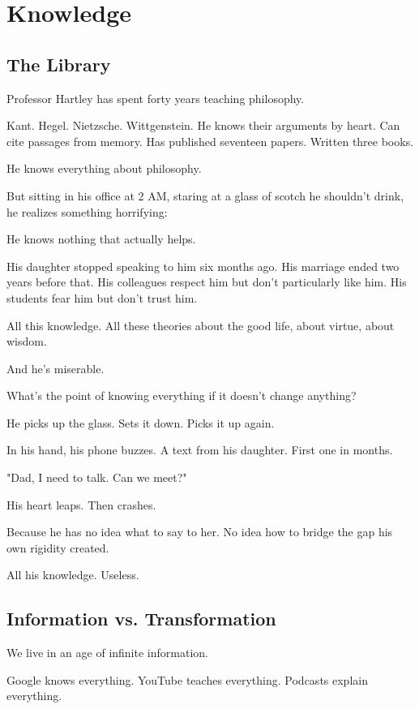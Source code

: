 \documentclass[11pt,twoside]{book}
\begin{document}
\chapter{Knowledge}

\section*{The Library}

Professor Hartley has spent forty years teaching philosophy.

Kant. Hegel. Nietzsche. Wittgenstein. He knows their arguments by heart. Can cite passages from memory. Has published seventeen papers. Written three books.

He knows everything about philosophy.

But sitting in his office at 2 AM, staring at a glass of scotch he shouldn't drink, he realizes something horrifying:

He knows nothing that actually helps.

His daughter stopped speaking to him six months ago. His marriage ended two years before that. His colleagues respect him but don't particularly like him. His students fear him but don't trust him.

All this knowledge. All these theories about the good life, about virtue, about wisdom.

And he's miserable.

What's the point of knowing everything if it doesn't change anything?

He picks up the glass. Sets it down. Picks it up again.

In his hand, his phone buzzes. A text from his daughter. First one in months.

"Dad, I need to talk. Can we meet?"

His heart leaps. Then crashes.

Because he has no idea what to say to her. No idea how to bridge the gap his own rigidity created.

All his knowledge. Useless.

\section*{Information vs. Transformation}

We live in an age of infinite information.

Google knows everything. YouTube teaches everything. Podcasts explain everything.
\end{document}
